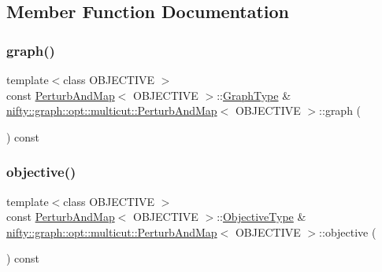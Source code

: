 \subsection{Member Function Documentation}
\mbox{\label{classnifty_1_1graph_1_1opt_1_1multicut_1_1PerturbAndMap_ac92f78f62353114a15c9b5069b82d9ed}} 
\subsubsection{\texorpdfstring{graph()}{graph()}}
{\footnotesize\ttfamily template$<$class O\+B\+J\+E\+C\+T\+I\+VE $>$ \\
const \hyperlink{classnifty_1_1graph_1_1opt_1_1multicut_1_1PerturbAndMap}{Perturb\+And\+Map}$<$ O\+B\+J\+E\+C\+T\+I\+VE $>$\+::\hyperlink{classnifty_1_1graph_1_1opt_1_1multicut_1_1PerturbAndMap_a4284b4d29c3e770b0e107fa794b3d32e}{Graph\+Type} \& \hyperlink{classnifty_1_1graph_1_1opt_1_1multicut_1_1PerturbAndMap}{nifty\+::graph\+::opt\+::multicut\+::\+Perturb\+And\+Map}$<$ O\+B\+J\+E\+C\+T\+I\+VE $>$\+::graph (\begin{DoxyParamCaption}{ }\end{DoxyParamCaption}) const}

\mbox{\label{classnifty_1_1graph_1_1opt_1_1multicut_1_1PerturbAndMap_a00e3f702037149e758472f3ddd7a45b1}} 
\subsubsection{\texorpdfstring{objective()}{objective()}}
{\footnotesize\ttfamily template$<$class O\+B\+J\+E\+C\+T\+I\+VE $>$ \\
const \hyperlink{classnifty_1_1graph_1_1opt_1_1multicut_1_1PerturbAndMap}{Perturb\+And\+Map}$<$ O\+B\+J\+E\+C\+T\+I\+VE $>$\+::\hyperlink{classnifty_1_1graph_1_1opt_1_1multicut_1_1PerturbAndMap_ac76585ed44501350bf31fbcc2d02078e}{Objective\+Type} \& \hyperlink{classnifty_1_1graph_1_1opt_1_1multicut_1_1PerturbAndMap}{nifty\+::graph\+::opt\+::multicut\+::\+Perturb\+And\+Map}$<$ O\+B\+J\+E\+C\+T\+I\+VE $>$\+::objective (\begin{DoxyParamCaption}{ }\end{DoxyParamCaption}) const}

